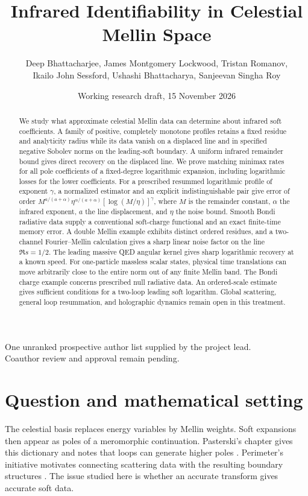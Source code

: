 \documentclass[11pt]{article}
\title{Infrared Identifiability in Celestial Mellin Space}
\author{\normalsize Deep Bhattacharjee, James Montgomery Lockwood, Tristan Romanov,\\
\normalsize Ikailo John Sessford, Ushashi Bhattacharya, Sanjeevan Singha Roy}
\date{Working research draft, 15 November 2026}
\theoremstyle{remark}\newtheorem{remark}[theorem]{Remark}
\begin{document}
\maketitle
\begin{center}\small\color{teal!70!black}
One unranked prospective author list supplied by the project lead.\\
Coauthor review and approval remain pending.
\end{center}
\begin{abstract}
We study what approximate celestial Mellin data can determine about infrared soft coefficients. A family of positive, completely monotone profiles retains a fixed residue and analyticity radius while its data vanish on a displaced line and in specified negative Sobolev norms on the leading-soft boundary. A uniform infrared remainder bound gives direct recovery on the displaced line. We prove matching minimax rates for all pole coefficients of a fixed-degree logarithmic expansion, including logarithmic losses for the lower coefficients. For a prescribed resummed logarithmic profile of exponent $\gamma$, a normalized estimator and an explicit indistinguishable pair give error of order $M^{a/(a+\alpha)}\eta^{\alpha/(a+\alpha)}[\log(M/\eta)]^\gamma$, where $M$ is the remainder constant, $\alpha$ the infrared exponent, $a$ the line displacement, and $\eta$ the noise bound. Smooth Bondi radiative data supply a conventional soft-charge functional and an exact finite-time memory error. A double Mellin example exhibits distinct ordered residues, and a two-channel Fourier--Mellin calculation gives a sharp linear noise factor on the line $\Re s=1/2$. The leading massive QED angular kernel gives sharp logarithmic recovery at a known speed. For one-particle massless scalar states, physical time translations can move arbitrarily close to the entire norm out of any finite Mellin band. The Bondi charge example concerns prescribed null radiative data. An ordered-scale estimate gives sufficient conditions for a two-loop leading soft logarithm. Global scattering, general loop resummation, and holographic dynamics remain open in this treatment.
\end{abstract}

\section{Question and mathematical setting}
The celestial basis replaces energy variables by Mellin weights. Soft expansions then appear as poles of a meromorphic continuation. Pasterski's chapter gives this dictionary and notes that loops can generate higher poles \cite{pasterski}. Perimeter's initiative motivates connecting scattering data with the resulting boundary structures \cite{perimeter}. The issue studied here is whether an accurate transform gives accurate soft data.
\end{document}

